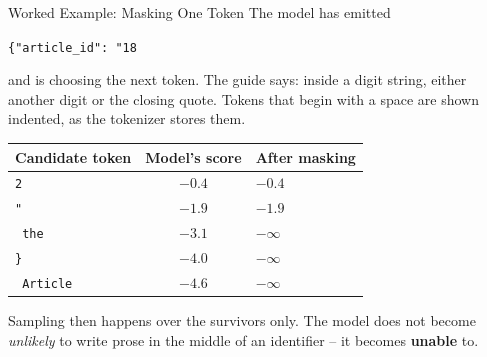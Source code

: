 \begin{frame}{Worked Example: Masking One Token}
\small
The model has emitted
\begin{center}
\texttt{\{"article\_id": "18}
\end{center}
and is choosing the next token. The guide says: inside a digit string, either another digit or the closing quote. Tokens that begin with a space are shown indented, as the tokenizer stores them.
\vspace{0.4em}

\centering
\small
\begin{tabular}{l|c|l}
Candidate token & Model's score & After masking \\
\hline
\texttt{2}        & $-0.4$ & $-0.4$ \\
\texttt{"}        & $-1.9$ & $-1.9$ \\
\texttt{\ the}    & $-3.1$ & $-\infty$ \\
\texttt{\}}       & $-4.0$ & $-\infty$ \\
\texttt{\ Article}& $-4.6$ & $-\infty$ \\
\end{tabular}

\vspace{0.5em}
\pause
\raggedright
\small
Sampling then happens over the survivors only. The model does not become \emph{unlikely} to write prose in the middle of an identifier -- it becomes \textbf{unable} to.
\end{frame}

